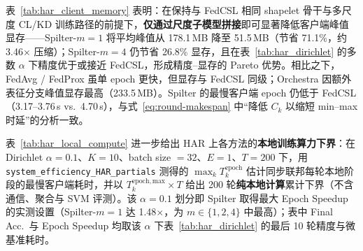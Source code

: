 \documentclass{article}
\begin{document}
表~\ref{tab:har_client_memory} 表明：在保持与 FedCSL 相同 shapelet 骨干与多尺度 CL/KD 训练路径的前提下，\textbf{仅通过尺度子模型拼接}即可显著降低客户端峰值显存——Spilter-$m{=}1$ 将平均峰值从 178.1\,MB 降至 51.5\,MB（节省 71.1\%，约 3.46$\times$ 压缩）；Spilter-$m{=}4$ 仍节省 26.8\% 显存，且在表~\ref{tab:har_dirichlet} 的多数 $\alpha$ 下精度优于或接近 FedCSL，形成精度--显存的 Pareto 优势。相比之下，FedAvg / FedProx 虽单 epoch 更快，但显存与 FedCSL 同级；Orchestra 因额外表征分支峰值显存最高（233.5\,MB）。Spilter 的最慢客户端 epoch 仍低于 FedCSL（3.17--3.76\,s vs.\ 4.70\,s），与式~\eqref{eq:round-makespan} 中``降低 $C_k$ 以缩短 min--max 时延''的分析一致。

表~\ref{tab:har_local_compute} 进一步给出 HAR 上各方法的\textbf{本地训练算力下界}：在 Dirichlet $\alpha=0.1$、$K=10$、batch size $=32$、$E=1$、$T=200$ 下，用 \texttt{system\_efficiency\_HAR\_partials} 测得的 $\max_k T_k^{\mathrm{epoch}}$ 估计同步联邦每轮本地阶段的最慢客户端耗时，并以 $T_k^{\mathrm{epoch,max}}\times T$ 给出 200 轮\textbf{纯本地计算}累计下界（不含通信、聚合与 SVM 评测）。该 $\alpha=0.1$ 划分即 Spilter 取得最大 Epoch Speedup 的实测设置（Spilter-$m{=}1$ 达 1.48$\times$，为 $m\in\{1,2,4\}$ 中最高）；表中 Final Acc.\ 与 Epoch Speedup 均取该 $\alpha$ 下表~\ref{tab:har_dirichlet} 的最后 10 轮精度与微基准耗时。
\end{document}
